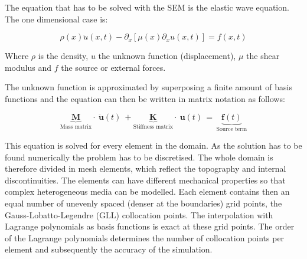 The equation that has to be solved with the SEM is the elastic wave equation. The one dimensional case is: 

\begin{equation}\label{1Dwave}
\rho(x) \ddot{u}(x,t) -  \partial_x \left[ \mu(x) \partial_x u(x,t) \right] = f(x,t)
\end{equation}

Where $\rho$ is the density, $u$ the unknown function (displacement), $\mu$ the shear modulus and $f$ the source or external forces.

The unknown function is approximated by superposing a finite amount of basis functions and the equation can then be written in matrix 
notation as follows: 

\begin{equation}\label{matrix_equation}
\underbrace{\textbf{M}}_{\text{Mass matrix}} \cdot \ \ddot{\textbf {u}} (t)  \ + \underbrace{\textbf{K}}_{\text{Stiffness matrix}} \cdot \ \textbf{u} (t) \, = \, \underbrace{\textbf{f} (t)}_{\text{Source term}} 
\end{equation}

%

This equation is solved for every element in the domain. 
As the solution has to be found numerically the problem has to be discretised. 
The whole domain is therefore divided in mesh elements, which reflect the topography and internal discontinuities.
The elements can have different mechanical properties so that complex heterogeneous media can be modelled. 
Each element contains then an equal number of unevenly spaced (denser at the boundaries) grid points, the 
Gauss-Lobatto-Legendre (GLL) collocation points.
The interpolation with Lagrange polynomials as basis functions is exact at these grid points. 
The order of the Lagrange polynomials determines the number of collocation points per element and subsequently the accuracy of the simulation. 

